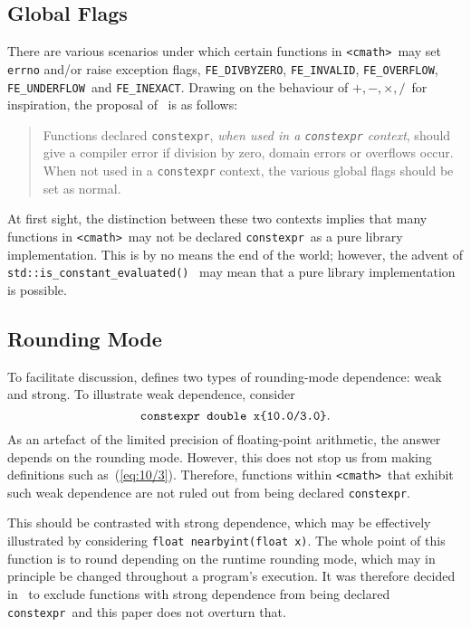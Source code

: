 \documentclass[prd,twocolumn,amsmath,amssymb,nofootinbib,eqsecnum]{revtex4-1}
\newcommand{\constexpr}{\code{constexpr}\xspace}
\newcommand{\code}[1]{{\tt #1}}
\newcommand{\header}[1]{{\tt <#1>}}
\newcommand{\cmath}{\header{cmath}}
\newcommand{\FEINVALID}{{\tt FE\_INVALID}}
\newcommand{\FEDIVBYZERO}{{\tt FE\_DIVBYZERO}}
\newcommand{\FEINEXACT}{{\tt FE\_INEXACT}}
\newcommand{\FEUNDERFLOW}{{\tt FE\_UNDERFLOW}}
\newcommand{\FEOVERFLOW}{{\tt FE\_OVERFLOW}}
\newcommand{\Operators}{\ensuremath{+,-,\times,/}}
\newcommand{\eq}[1]{(\ref{eq:#1})}
\begin{document}
\subsection{Global Flags}

There are various scenarios under which certain functions in \cmath\ may set \code{errno} and/or raise exception flags, \FEDIVBYZERO, \FEINVALID, \FEOVERFLOW, \FEUNDERFLOW\ and
\FEINEXACT. Drawing on the behaviour of \Operators\ for inspiration, the proposal of~\cite{Rosten-constexpr} is as follows:
\begin{quotation}
	Functions declared \constexpr, \emph{when used in a \constexpr
context}, should give a compiler error if division by zero, domain errors or
overflows occur. When not used in a \constexpr context, the various global
flags should be set as normal.
\end{quotation}
At first sight, the distinction between these two contexts implies that many functions in \cmath\ may not be declared \constexpr\ as a pure library implementation. This is by no means the end of the world; however, the advent of \code{std::is\_constant\_evaluated()}~\cite{ConstEval}
may mean that a pure library implementation is possible.

\subsection{Rounding Mode}
\label{sec:rounding}

To facilitate discussion, \cite{Rosten-constexpr} defines two types of rounding-mode dependence: weak and strong. To illustrate weak dependence, consider
\begin{equation}
	\mbox{\code{constexpr double x\{10.0/3.0\}}}.
\label{eq:10/3}
\end{equation}
As an artefact of the limited precision of floating-point arithmetic, the answer depends on the rounding mode. However, this does not stop us from making definitions such as~\eq{10/3}. Therefore, functions  within \cmath\ that exhibit such weak dependence are not ruled out from being declared \constexpr.

This should be contrasted with strong dependence, which may be effectively illustrated by considering \code{float nearbyint(float x)}. The whole point of this function is to round depending on the runtime rounding mode, which may in principle be changed throughout a program's execution. It was therefore decided in~\cite{Rosten-constexpr} to exclude functions with strong dependence from being declared \constexpr\ and this paper does not overturn that.
\end{document}

